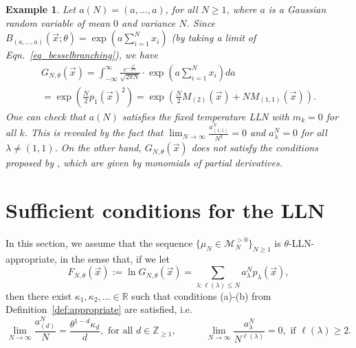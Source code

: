 \documentclass[11pt]{article}
\theoremstyle{plain}
\newtheorem{example}[lemma]{Example}
\newcommand{\Z}{\mathbb Z}
\newcommand{\R}{\mathbb R}
\newcommand{\la}{\lambda}
\newcommand{\M}{\mathcal M}
\newcommand{\vecx}{\vec{x}}
\begin{document}
\begin{example}
     Let $a(N)=(a,\dots,a)$, for all $N\ge 1$, where $a$ is a Gaussian random variable of mean $0$ and variance $N$. Since $B_{(a,\dots,a)}(\vecx;\theta)=\exp\left(a\sum_{i=1}^N{x_i}\right)$ (by taking a limit of Eqn.~\eqref{eq_besselbranching}), we have  
    \begin{multline*}
        G_{N,\theta}(\vecx) = \int_{-\infty}^{\infty}{\frac{e^{-\frac{a^{2}}{2N}}}{\sqrt{2\pi N}}\cdot\exp\left(a\sum_{i=1}^{N}x_{i}\right)da}\\
        = \exp\left(\frac{N}{2}p_{1}(\vecx)^{2}\right) = \exp\left(\frac{N}{2}M_{(2)}(\vecx)+NM_{(1,1)}(\vecx)\right).
    \end{multline*}
    One can check that $a(N)$ satisfies the fixed temperature LLN with $m_k=0$ for all $k$. This is revealed by the fact that $\lim_{N\rightarrow\infty}\frac{a^N_{(1,1)}}{N^2}=0$ and $a^N_\la=0$ for all $\la\ne (1,1)$. On the other hand, $G_{N,\theta}(\vecx)$ does not satisfy the conditions proposed by \cite[Claim 9.1]{BCG}, which are given by monomials of partial derivatives.
\end{example}



\section{Sufficient conditions for the LLN}\label{sec:sufficient}


In this section, we assume that the sequence $\{\mu_N\in\M_N^{>0}\}_{N\ge 1}$ is $\theta$-LLN-appropriate, in the sense that, if we let
\begin{equation}\label{eqn:suff_assumption_1}
F_{N,\theta}(\vecx) := \ln{G_{N,\theta}(\vecx)} = \sum_{\la\colon\ell(\la)\le N}{a_\la^N p_\la(\vecx)},
\end{equation}
then there exist $\kappa_1,\kappa_2,\dots\in\R$ such that conditions (a)-(b) from Definition~\ref{def:appropriate} are satisfied, i.e.
\begin{equation}\label{eqn:suff_assumption_2}
\lim_{N\to\infty}{\frac{a_{(d)}^N}{N}} = \frac{\theta^{1-d}\kappa_d}{d},\text{ for all } d\in\Z_{\ge 1},\qquad\quad
\lim_{N\to\infty}{\frac{a_\la^N}{N^{\ell(\la)}}}=0, \text{ if }\ell(\la)\ge 2.
\end{equation}

\medskip
\end{document}
